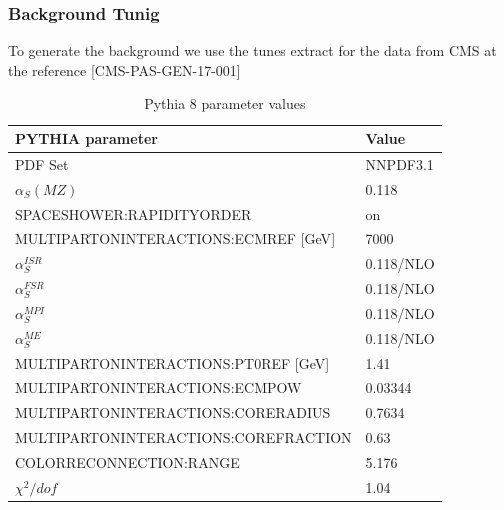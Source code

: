 \documentclass{beamer}
\begin{document}
\begin{frame}
\frametitle{Background Tunig}
{\small To generate the background we use the tunes extract for the data from CMS at the reference [CMS-PAS-GEN-17-001] }

{\scriptsize
	\begin{table}[]
		\begin{tabular}{ll}
			\hline
			\textbf{PYTHIA parameter}                & \textbf{Value} \\\hline
			PDF Set                                  & NNPDF3.1       \\
			$\alpha_S(MZ)$                           & 0.118          \\
			SPACESHOWER:RAPIDITYORDER                & on             \\
			MULTIPARTONINTERACTIONS:ECMREF {[}GeV{]} & 7000           \\
			$\alpha^{ISR}_S$                         & 0.118/NLO      \\
			$\alpha^{FSR}_S$                         & 0.118/NLO      \\
			$\alpha^{MPI}_S$                         & 0.118/NLO      \\
			$\alpha^{ME}_S$                          & 0.118/NLO      \\
			MULTIPARTONINTERACTIONS:PT0REF {[}GeV{]} & 1.41           \\
			MULTIPARTONINTERACTIONS:ECMPOW           & 0.03344        \\
			MULTIPARTONINTERACTIONS:CORERADIUS       & 0.7634         \\
			MULTIPARTONINTERACTIONS:COREFRACTION     & 0.63           \\
			COLORRECONNECTION:RANGE                  & 5.176          \\
			$\chi^2/dof$                             & 1.04           \\\hline
		\end{tabular}
		\caption{Pythia 8 parameter values }
		\label{PythiaTune}
		
	\end{table}
}

\end{frame}


\end{document}
